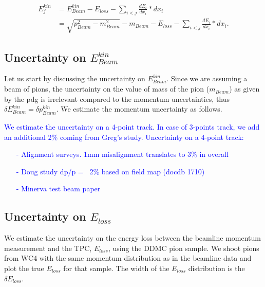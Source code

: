 \begin{align}
 E_{j}^{kin} &=  E_{Beam}^{kin}  - E_{loss} - \sum_{i < j} \frac {dE_i}{dx_i}*dx_i\\
                  &=  \sqrt{p^2_{Beam} - m^2_{Beam}} - m_{Beam} - E_{loss} - \sum_{i < j} \frac {dE_i}{dx_i}*dx_i.
\end{align}

\subsection{Uncertainty on $E_{Beam}^{kin}$}
Let us start by discussing the uncertainty on $E_{Beam}^{kin}$. Since we are assuming a beam of pions, the uncertainty on the value of mass of the pion ($m_{Beam}$) as given by the pdg is irrelevant compared to the momentum uncertainties, thus $\delta E_{Beam}^{kin} = \delta p_{Beam}^{kin}$. 
We estimate the momentum uncertainty as follows.

\textcolor{blue}{  
We estimate the uncertainty on a 4-point track. In case of 3-points track, we add an additional 2\% coming from Greg's study. 
Uncertainty on a 4-point track:
\begin{itemize}
\item[-]  Alignment surveys. 1mm misalignment translates to 3\% in overall
\item[-] Doug study dp/p = ~2\% based on field map (docdb 1710)
\item[-] Minerva test beam paper
\end{itemize}
}

\subsection{Uncertainty on $E_{loss}$}
We estimate the uncertainty on the energy loss between the beamline momentum measurement and the TPC, $E_{loss}$, using the DDMC pion sample. We shoot pions from WC4 with the same momentum distribution as in the beamline data and plot the true $E_{loss}$ for that sample. The width of the $E_{loss}$ distribution is the $\delta E_{loss}$.

